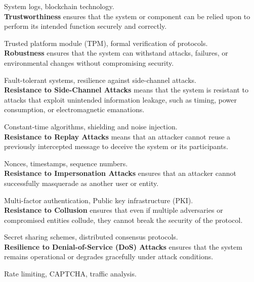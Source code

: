 \documentclass[pdflatex,sn-mathphys-num]{sn-jnl}%
\theoremstyle{thmstyleone}%
\theoremstyle{thmstyletwo}%
\theoremstyle{thmstylethree}%
\begin{document}
 System logs, blockchain technology.\\


\noindent \textbf{Trustworthiness} ensures that the system or component can be relied upon to perform its intended function securely and correctly.

 Trusted platform module (TPM), formal verification of protocols.\\


\noindent \textbf{Robustness}  ensures that the system can withstand attacks, failures, or environmental changes without compromising security.

 Fault-tolerant systems, resilience against side-channel attacks.\\


\noindent \textbf{Resistance to Side-Channel Attacks} means that the system is resistant to attacks that exploit unintended information leakage, such as timing, power consumption, or electromagnetic emanations.

 Constant-time algorithms, shielding and noise injection.\\


\noindent \textbf{Resistance to Replay Attacks} means that an attacker cannot reuse a previously intercepted message to deceive the system or its participants.

 Nonces, timestamps, sequence numbers.\\


\noindent \textbf{Resistance to Impersonation Attacks} ensures that an attacker cannot successfully masquerade as another user or entity.

 Multi-factor authentication, Public key infrastructure (PKI).\\


\noindent \textbf{Resistance to Collusion} ensures that even if multiple adversaries or compromised entities collude, they cannot break the security of the protocol.

   Secret sharing schemes, distributed consensus protocols.\\


\noindent \textbf{Resilience to Denial-of-Service (DoS) Attacks} ensures that the system remains operational or degrades gracefully under attack conditions.

 Rate limiting, CAPTCHA, traffic analysis.\\
\end{document}

